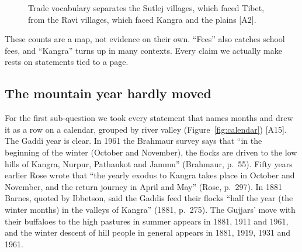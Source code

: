 \documentclass[10pt,a4paper,twocolumn]{article}
\newcommand{\pg}[2]{(#1, p.~#2)}
\newcommand{\entry}[1]{{\small\sffamily\color{muted}[#1]}}
\begin{document}
\begin{figure}[!htbp]
\centering
{}
\caption{Trade vocabulary separates the Sutlej villages, which faced Tibet, from the Ravi villages, which faced Kangra and the plains \entry{A2}.}\label{fig:trade}
\end{figure}

These counts are a map, not evidence on their own. ``Fees'' also catches school fees, and ``Kangra'' turns up in many contexts. Every claim we actually make rests on statements tied to a page.

\subsection{The mountain year hardly moved}

For the first sub-question we took every statement that names months and drew it as a row on a calendar, grouped by river valley (Figure~\ref{fig:calendar}) \entry{A15}. The Gaddi year is clear. In 1961 the Brahmaur survey says that ``in the beginning of the winter (October and November), the flocks are driven to the low hills of Kangra, Nurpur, Pathankot and Jammu'' \pg{Brahmaur}{55}. Fifty years earlier Rose wrote that ``the yearly exodus to Kangra takes place in October and November, and the return journey in April and May'' \pg{Rose}{297}. In 1881 Barnes, quoted by Ibbetson, said the Gaddis feed their flocks ``half the year (the winter months) in the valleys of Kangra'' \pg{1881}{275}. The Gujjars' move with their buffaloes to the high pastures in summer appears in 1881, 1911 and 1961, and the winter descent of hill people in general appears in 1881, 1919, 1931 and 1961.
\end{document}
